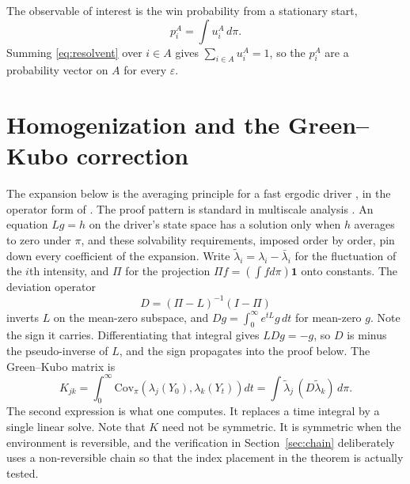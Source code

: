 \documentclass[11pt]{article}
\theoremstyle{remark}
\newcommand{\lbar}{\bar{\lambda}}
\begin{document}
The observable of interest is the win probability from a stationary start,
\begin{equation}\label{eq:p}
  p_i^A = \int u_i^A \, d\pi .
\end{equation}
Summing \eqref{eq:resolvent} over $i \in A$ gives $\sum_{i \in A} u_i^A = 1$,
so the $p_i^A$ are a probability vector on $A$ for every $\varepsilon$.

\section{Homogenization and the Green--Kubo correction}\label{sec:theory}

The expansion below is the averaging principle for a fast ergodic driver
\citep{khasminskii1966}, in the operator form of \citet{kurtz1973}. The proof
pattern is standard in multiscale analysis \citep[Ch.~9]{pavliotis2008}. An
equation $Lg = h$ on the driver's state space has a solution only when $h$
averages to zero under $\pi$, and these solvability requirements, imposed
order by order, pin down every coefficient of the expansion. Write
$\tilde\lambda_i = \lambda_i - \lbar_i$ for the fluctuation of the $i$th
intensity, and $\Pi$ for the projection $\Pi f = (\int f d\pi)\mathbf{1}$ onto
constants. The deviation operator
\begin{equation}\label{eq:deviation}
  D = (\Pi - L)^{-1}(I - \Pi)
\end{equation}
inverts $L$ on the mean-zero subspace, and $Dg = \int_0^\infty e^{tL}g \, dt$
for mean-zero $g$. Note the sign it carries. Differentiating that integral
gives $LDg = -g$, so $D$ is minus the pseudo-inverse of $L$, and the sign
propagates into the proof below. The Green--Kubo matrix is
\begin{equation}\label{eq:K}
  K_{jk} = \int_0^\infty \mathrm{Cov}_\pi\!\left(\lambda_j(Y_0),
  \lambda_k(Y_t)\right) dt
  = \int \tilde\lambda_j \, (D\tilde\lambda_k) \, d\pi .
\end{equation}
The second expression is what one computes. It replaces a time integral by a
single linear solve. Note that $K$ need not be symmetric. It is symmetric when
the environment is reversible, and the verification in Section~\ref{sec:chain}
deliberately uses a non-reversible chain so that the index placement in the
theorem is actually tested.
\end{document}

